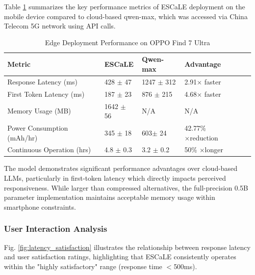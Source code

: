 \documentclass[preprint,12pt]{elsarticle}
\begin{document}
Table \ref{tab:edge_performance} summarizes the key performance metrics of ESCaLE deployment on the mobile device compared to cloud-based qwen-max, which was accessed via China Telecom 5G network using API calls.

\begin{table}[htbp]
\centering
\caption{Edge Deployment Performance on OPPO Find 7 Ultra}
\label{tab:edge_performance}
\small
\begin{tabular}{p{5cm}p{1.8cm}p{2.5cm}p{2.5cm}p{2cm}}
\hline
\textbf{Metric} & \textbf{ESCaLE} & \textbf{Qwen-max} & \textbf{Advantage} \\
\hline
Response Latency (ms) & 428 $\pm$ 47 & 1247 $\pm$ 312 & 2.91× faster \\
First Token Latency (ms) & 187 $\pm$ 23 & 876 $\pm$ 215 & 4.68× faster \\
Memory Usage (MB) & 1642 $\pm$ 56 & N/A & N/A  \\
Power Consumption (mAh/hr) & 345 $\pm$ 18 & 603$\pm$ 24 & 42.77\% ×reduction \\
Continuous Operation (hrs) & 4.8 $\pm$ 0.3 & 3.2 $\pm$ 0.2 & 50\% ×longer \\
\hline
\end{tabular}
\end{table}

The model demonstrates significant performance advantages over cloud-based LLMs, particularly in first-token latency which directly impacts perceived responsiveness. While larger than compressed alternatives, the full-precision 0.5B parameter implementation maintains acceptable memory usage within smartphone constraints.

\subsubsection{User Interaction Analysis}

Fig. \ref{fig:latency_satisfaction} illustrates the relationship between response latency and user satisfaction ratings, highlighting that ESCaLE consistently operates within the "highly satisfactory" range (response time $<$500ms).
\end{document}
